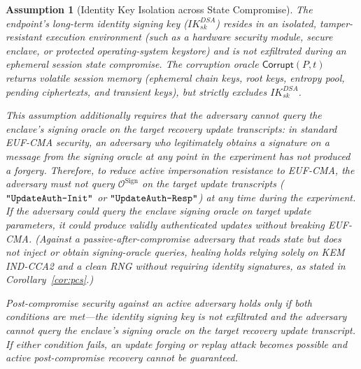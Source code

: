 \documentclass[11pt,a4paper]{article}
\theoremstyle{remark}
\theoremstyle{plain}
\newtheorem{assumption}[theorem]{Assumption}
\newcommand{\calO}{\mathcal{O}}
\newcommand{\strlit}[1]{\text{\upshape\texttt{"#1"}}}
\begin{document}
\begin{assumption}[Identity Key Isolation across State Compromise]
\label{asm:idkey-isolation}
The endpoint's long-term identity signing key ($IK^{DSA}_{sk}$) resides in an isolated, tamper-resistant
execution environment (such as a hardware security module, secure enclave, or protected operating-system keystore)
and is not exfiltrated during an ephemeral session state compromise.  The corruption oracle
$\mathsf{Corrupt}(P, t)$ returns volatile session memory (ephemeral chain keys, root keys, entropy pool,
pending ciphertexts, and transient keys), but strictly excludes $IK^{DSA}_{sk}$.

This assumption additionally requires that \emph{the adversary cannot query the enclave's signing oracle on the target recovery update transcripts}: in standard EUF-CMA security, an adversary who legitimately obtains a signature on a message from the signing oracle at \emph{any} point in the experiment has not produced a forgery.  Therefore, to reduce active impersonation resistance to EUF-CMA, the adversary must not query $\calO^{\mathrm{Sign}}$ on the target update transcripts ($\strlit{UpdateAuth-Init}$ or $\strlit{UpdateAuth-Resp}$) at any time during the experiment.  If the adversary could query the enclave signing oracle on target update parameters, it could produce validly authenticated updates without breaking EUF-CMA.  (Against a passive-after-compromise adversary that reads state but does not inject or obtain signing-oracle queries, healing holds relying solely on KEM IND-CCA2 and a clean RNG without requiring identity signatures, as stated in Corollary~\ref{cor:pcs}.)

Post-compromise security against an active adversary holds only if both conditions are met---the identity signing key is not
exfiltrated \emph{and} the adversary cannot query the enclave's signing oracle on the target recovery update transcript.  If either condition fails, an update forging or replay attack becomes possible and active post-compromise recovery cannot be guaranteed.
\end{assumption}
\end{document}
